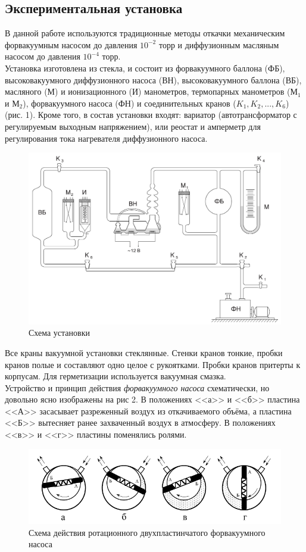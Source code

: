 \documentclass[12pt,a4paper]{article}
\begin{document}
\subsection*{Экспериментальная установка}
 В данной работе используются традиционные методы откачки механическим форвакуумным насосом до давления $10^{-2}$ торр и диффузионным масляным насосом до давления $10^{-4}$ торр. \\
 	Установка изготовлена из стекла,
 и состоит из форвакуумного баллона (ФБ), высоковакуумного диффузионного насоса (ВН), высоковакуумного баллона (ВБ), масляного (М) и ионизационного (И) манометров, термопарных манометров ($\text{М}_1$ и $\text{М}_2$), форвакуумного насоса (ФН) и соединительных кранов ($K_1, K_2,..., K_6$) (рис. 1). Кроме того, в состав установки входят: вариатор
 (автотрансформатор с регулируемым выходным напряжением), или
 реостат и амперметр для регулирования тока нагревателя диффузионного насоса. \\
  \begin{figure}[!h]
 	\centering
 	\includegraphics[width=0.5\linewidth]{"схема.png"}
 	\caption[]{Схема установки}
 	\label{fig:Схема установки}
 \end{figure}
 Все краны вакуумной установки стеклянные. Стенки кранов тонкие, пробки кранов полые и составляют одно целое с рукоятками. Пробки кранов притерты к корпусам. Для герметизации используется вакуумная смазка. \\
 Устройство и принцип действия \textit{форвакуумного насоса} схематически, но довольно ясно изображены на рис 2. В положениях <<а>> и <<б>> пластина <<А>> засасывает разреженный воздух из откачиваемого объёма, а пластина <<Б>> вытесняет ранее захваченный воздух в атмосферу. В положениях <<в>> и <<г>> пластины поменялись ролями.
\begin{figure}[!h]
	\centering
	\includegraphics[width=0.9\linewidth]{"фв.png"}
	\caption[]{Схема действия ротационного двухпластинчатого форвакуумного насоса}
	\label{fig:Схема ФВ насоса}
\end{figure}
\end{document}
